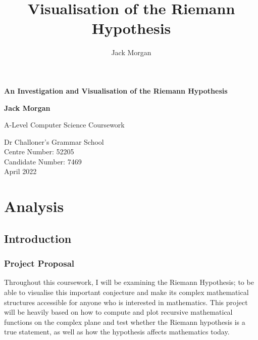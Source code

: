 \documentclass{article}
\author{Jack Morgan}
\title{Visualisation of the Riemann Hypothesis}
\begin{document}
\begin{titlepage}
    \begin{center}
    \vspace*{1cm}

    \Huge
    \textbf{An Investigation and Visualisation of the Riemann Hypothesis}

    \vspace{0.5cm}
    \LARGE
    \vspace{1.5cm}

    \textbf{Jack Morgan}

    \vfill

    A-Level Computer Science Coursework\\

    \vspace{2cm}

    \Large
    Dr Challoner's Grammar School\\
    Centre Number: 52205\\
    Candidate Number: 7469\\
    April 2022\\

    \vspace{1cm}

    \end{center}
\end{titlepage}

\tableofcontents

\clearpage

\section{Analysis}

\subsection{Introduction}

\subsubsection{Project Proposal}

Throughout this coursework, I will be examining the Riemann Hypothesis; to be able to visualise this important conjecture and make its complex mathematical structures accessible for anyone who is interested in mathematics. This project will be heavily based on how to compute and plot recursive mathematical functions on the complex plane and test whether the Riemann hypothesis is a true statement, as well as how the hypothesis affects mathematics today.
\end{document}
